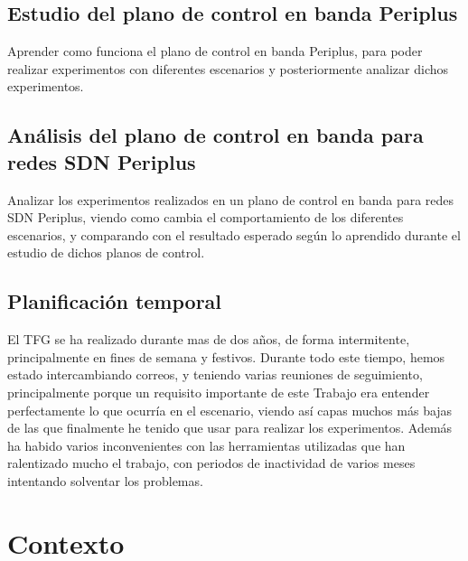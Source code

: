 \documentclass[a4paper, 12pt]{book}
\begin{document}
	
	\section{Estudio del plano de control en banda Periplus}
	\label{sec:objetivos-periplus}
	
	Aprender como funciona el plano de control en banda Periplus, para poder realizar experimentos con diferentes escenarios y posteriormente analizar dichos experimentos.
	
	\section{Análisis del plano de control en banda para redes SDN Periplus}
	
	Analizar los experimentos realizados en un plano de control en banda para redes SDN Periplus, viendo como cambia el comportamiento de los diferentes escenarios, y comparando con el resultado esperado según lo aprendido durante el estudio de dichos planos de control.
	\label{sec:objetivos-analisis-periplus}
	

	
	\cleardoublepage
	\section{Planificación temporal}
	\label{sec:planificacion-temporal}
	
	El TFG se ha realizado durante mas de dos años, de forma intermitente, principalmente en fines de semana y festivos. Durante todo este tiempo, hemos estado intercambiando correos, y teniendo varias reuniones de seguimiento, principalmente porque un requisito importante de este Trabajo era entender perfectamente lo que ocurría en el escenario, viendo así capas muchos más bajas de las que finalmente he tenido que usar para realizar los experimentos.
	Además ha habido varios inconvenientes con las herramientas utilizadas que han ralentizado mucho el trabajo, con periodos de inactividad de varios meses intentando solventar los problemas.
	
	
	
	\cleardoublepage
	\chapter{Contexto}
	\label{chap:estado}
\end{document}
